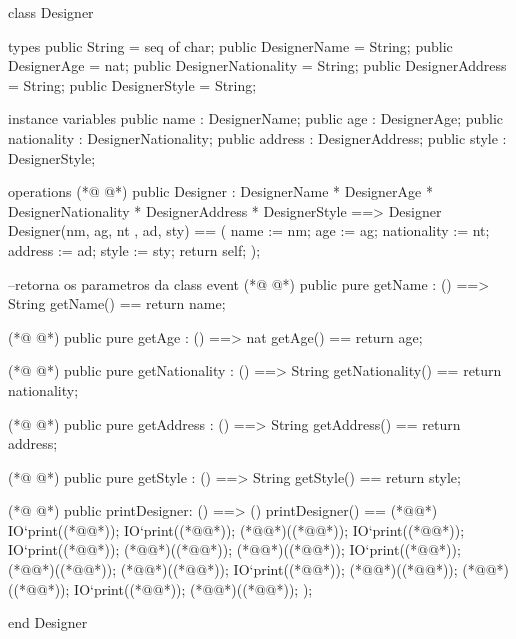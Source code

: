 \begin{vdmpp}[breaklines=true]
class Designer

types
 public String = seq of char;
 public DesignerName = String;
 public DesignerAge = nat;
 public DesignerNationality = String;
 public DesignerAddress = String;
 public DesignerStyle = String;
 
instance variables
 public name : DesignerName;
 public age : DesignerAge;
 public nationality : DesignerNationality;
 public address : DesignerAddress;
 public style : DesignerStyle;
 
 operations
(*@
\label{Designer:19}
@*)
  public Designer : 
          DesignerName * 
          DesignerAge *
          DesignerNationality * 
          DesignerAddress * 
          DesignerStyle   ==> Designer
  Designer(nm, ag, nt , ad, sty) ==
  (
    name := nm;
    age := ag;
    nationality := nt;
    address := ad;
    style := sty;
    return self;
  );
  
  --retorna os parametros da class event
(*@
\label{getName:36}
@*)
  public pure getName : () ==> String
    getName() == return name;
    
(*@
\label{getAge:39}
@*)
   public pure getAge : () ==> nat
     getAge() == return age;
     
(*@
\label{getNationality:42}
@*)
  public pure getNationality : () ==> String
     getNationality() == return nationality;
     
(*@
\label{getAddress:45}
@*)
  public pure getAddress : () ==> String
     getAddress() == return address;      
     
(*@
\label{getStyle:48}
@*)
  public pure getStyle : () ==> String
     getStyle() == return style;
     
(*@
\label{printDesigner:51}
@*)
  public printDesigner: () ==> ()
  printDesigner() == (*@\vdmnotcovered{(}@*)
  IO`print((*@@*));
   IO`print((*@@*));
   (*@@*)((*@@*));
   IO`print((*@@*));
   IO`print((*@@*));
   (*@@*)((*@@*));
   (*@@*)((*@@*));
   IO`print((*@@*));
   (*@@*)((*@@*));
   (*@@*)((*@@*));
    IO`print((*@@*));
   (*@@*)((*@@*));
   (*@@*)((*@@*));
   IO`print((*@@*));
   (*@@*)((*@@*));
  );
     
end Designer
\end{vdmpp}
